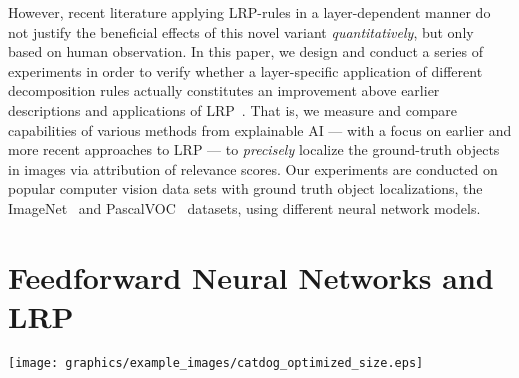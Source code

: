 \documentclass[conference]{IEEEtran}
\def\eg{\emph{e.g.~}}
\newcommand{\lrpz}[0]{\emph{LRP}}
\newcommand{\lrpalphabeta}[0]{\emph{LRP}}
\newcommand{\lrpflat}[0]{\emph{LRP}}
\newcommand{\lrpcnn}[0]{\emph{LRP}}
\newcommand{\LRPCMP}[0]{\textbf{\lrpcnn}}
\begin{document}
However, recent literature applying LRP-rules in a layer-dependent manner
do not justify the beneficial effects of this novel variant \emph{quantitatively}, but only based on human observation.
In this paper, we design and conduct a series of experiments in order to verify whether a layer-specific application of different decomposition rules actually constitutes an improvement above earlier descriptions and applications of LRP~\cite{lapuschkin2016analyzing,samek2016evaluating}.
That is,
we measure and compare capabilities of various methods from explainable AI --- with a focus on earlier and more recent approaches to LRP ---
to \emph{precisely} localize the ground-truth objects in images via attribution of relevance scores.
Our experiments are conducted on popular computer vision data sets with ground truth object localizations, the ImageNet~\cite{ILSVRC15} and PascalVOC~\cite{pascal-voc-2012} datasets, using different neural network models.


\section{Feedforward Neural Networks and LRP }
\label{seq:lrp-sequential}

\begin{figure*}[!h]
  \begin{center}
    \texttt{[image: graphics/example\_images/catdog\_optimized\_size.eps]}
    \caption{Different attributions for the output classes ``Tiger Cat'' and ``Bernese Mountain Dog'' using the VGG-16 model.
    Network output strengths (logit) of the respective classes is given in parentheses.
    Network-widely applied rules in
    \emph{(a)} - \emph{(d)} (\lrpz, \lrpalphabeta, Guided Backprop and Pattern Attribution respectively),
    are not, or hardly class discriminative.
    An application of \lrpz~to every layer shows the effect of gradient shattering.
    Variants of \LRPCMP~implementing a composite strategy of LRP rule application shown in \emph{(e)} - \emph{(g)} --- here, from left to right, the \lrpflat-rule  is not applied at all, the three lowest convolution layers, and all convolution and pooling layers --- are sensitive to class-specific information and highlight features on different levels of scale and conceptuality (\eg highlighting the fur pattern activating ``Tiger Cat'' vs highlighting the general region showing a ``Tiger Cat'').
    Attributions from \LRPCMP~visualized in red/warm colors identify image regions contributing to the prediction of the target class, while regions marked in blue/cold hues provide contradictory evidence.
    Further examples can be found in the Appendix.}

    \label{fig:ex_image_catdog}
  \end{center}
\end{figure*}
\end{document}
